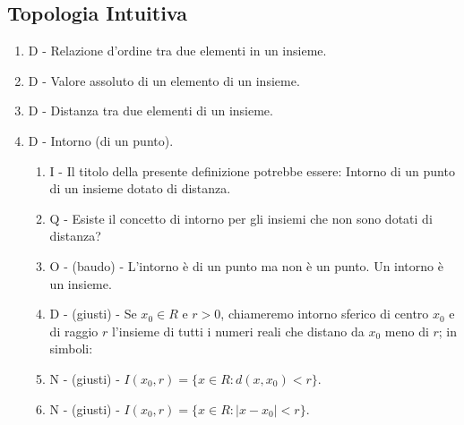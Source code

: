 \documentclass[]{article}
\begin{document}
\subsection{Topologia Intuitiva}
\begin{enumerate}
  \item D - Relazione d'ordine tra due elementi in un insieme.
  \item D - Valore assoluto di un elemento di un insieme.
  \item D - Distanza tra due elementi di un insieme.
  \item D - Intorno (di un punto).
	\begin{enumerate}
	  \item I - Il titolo della presente definizione potrebbe essere: Intorno di un punto di un insieme dotato di distanza.
	  \item Q - Esiste il concetto di intorno per gli insiemi che non sono dotati di distanza?
	  \item O - (baudo) - L'intorno \`e di un punto ma non \`e un punto. Un intorno \`e un insieme.
	  \item D - (giusti) - Se $x_0 \in R$ e $r>0$, chiameremo intorno sferico di centro $x_0$ e di raggio $r$ l'insieme di tutti i numeri reali che distano da $x_0$ meno di $r$; in simboli:
	  \item N - (giusti) - $I(x_0,r)=\{x \in R : d(x,x_0)<r\}$.
	  \item N - (giusti) - $I(x_0,r)=\{x \in R : |x-x_0|<r\}$.
	\end{enumerate}
\end{enumerate}

\end{document}
